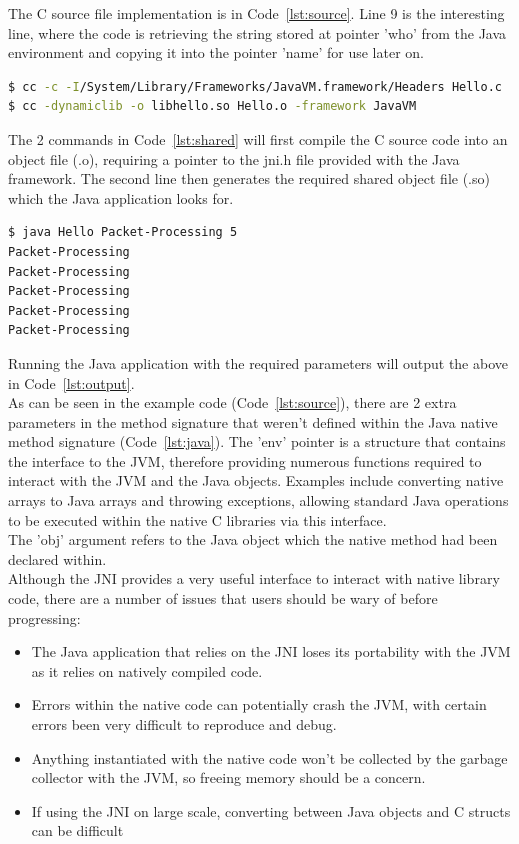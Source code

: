 \documentclass[a4paper, titlepage]{article}
\begin{document}
The C source file implementation is in Code~\ref{lst:source}. Line 9 is the interesting line, where the code is retrieving the string stored at pointer 'who' from the Java environment and copying it into the pointer 'name' for use later on.

\begin{lstlisting}[language=sh, caption={Terminal commands to generate shared library file (.so)}, label=lst:shared]
$ cc -c -I/System/Library/Frameworks/JavaVM.framework/Headers Hello.c
$ cc -dynamiclib -o libhello.so Hello.o -framework JavaVM
\end{lstlisting}

The 2 commands in Code~\ref{lst:shared} will first compile the C source code into an object file (.o), requiring a pointer to the jni.h file provided with the Java framework. The second line then generates the required shared object file (.so) which the Java application looks for.

\begin{lstlisting}[language=sh, caption={Output from running Java application calling native C methods}, label=lst:output]
$ java Hello Packet-Processing 5
Packet-Processing
Packet-Processing
Packet-Processing
Packet-Processing
Packet-Processing
\end{lstlisting}

Running the Java application with the required parameters will output the above in Code~\ref{lst:output}. \\
\newline
As can be seen in the example code (Code~\ref{lst:source}), there are 2 extra parameters in the method signature that weren't defined within the Java native method signature (Code~\ref{lst:java}). The 'env' pointer is a structure that contains the interface to the JVM, therefore providing numerous functions required to interact with the JVM and the Java objects. Examples include converting native arrays to Java arrays and throwing exceptions, allowing standard Java operations to be executed within the native C libraries via this interface. \\
\newline
The 'obj' argument refers to the Java object which the native method had been declared within. \\
\newline
Although the JNI provides a very useful interface to interact with native library code, there are a number of issues that users should be wary of before progressing:
\begin{itemize}
	\item The Java application that relies on the JNI loses its portability with the JVM as it relies on natively compiled code.
	\item Errors within the native code can potentially crash the JVM, with certain errors been very difficult to reproduce and debug.
	\item Anything instantiated with the native code won't be collected by the garbage collector with the JVM, so freeing memory should be a concern.
	\item If using the JNI on large scale, converting between Java objects and C structs can be difficult
\end{itemize}
\end{document}
